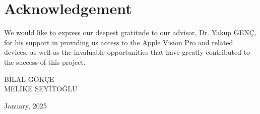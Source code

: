 \chapter*{Acknowledgement}

We would like to express our deepest gratitude to our advisor, Dr. Yakup GENÇ, for his support in providing us access to the Apple Vision Pro and related devices, as well as the invaluable opportunities that have greatly contributed to the success of this project.

\vspace{1cm}
\begin{flushright}
    BİLAL GÖKÇE \\
    MELİKE SEYİTOĞLU \\
\end{flushright}
\begin{flushleft}
    January, 2025
\end{flushleft}
\clearpage